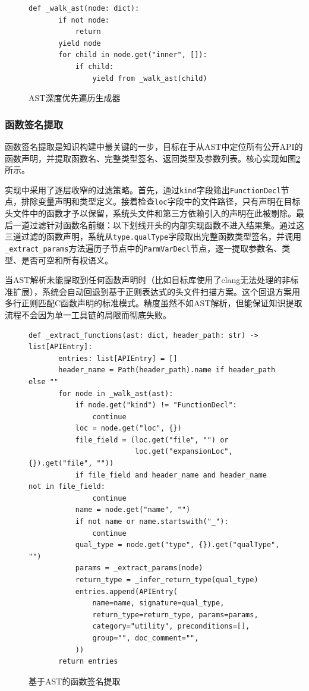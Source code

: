 \begin{figure}[H]
    \centering
    \begin{lstlisting}[style=style@python]
   def _walk_ast(node: dict):
       if not node:
           return
       yield node
       for child in node.get("inner", []):
           if child:
               yield from _walk_ast(child)
    \end{lstlisting}
    \caption{AST深度优先遍历生成器}
    \label{fig:walk-ast}
\end{figure}

\subsubsection{函数签名提取}

函数签名提取是知识构建中最关键的一步，目标在于从AST中定位所有公开API的函数声明，并提取函数名、完整类型签名、返回类型及参数列表。核心实现如图\ref{fig:extract-functions}所示。

实现中采用了逐层收窄的过滤策略。首先，通过\texttt{kind}字段筛出\texttt{FunctionDecl}节点，排除变量声明和类型定义。接着检查\texttt{loc}字段中的文件路径，只有声明在目标头文件中的函数才予以保留，系统头文件和第三方依赖引入的声明在此被剔除。最后一道过滤针对函数名前缀：以下划线开头的内部实现函数不进入结果集。通过这三道过滤的函数声明，系统从\texttt{type.qualType}字段取出完整函数类型签名，并调用\texttt{\_extract\_params}方法遍历子节点中的\texttt{ParmVarDecl}节点，逐一提取参数名、类型、是否可空和所有权语义。

当AST解析未能提取到任何函数声明时（比如目标库使用了clang无法处理的非标准扩展），系统会自动回退到基于正则表达式的头文件扫描方案。这个回退方案用多行正则匹配C函数声明的标准模式。精度虽然不如AST解析，但能保证知识提取流程不会因为单一工具链的局限而彻底失败。

\begin{figure}[H]
    \centering
    \begin{lstlisting}[style=style@python]
   def _extract_functions(ast: dict, header_path: str) -> list[APIEntry]:
       entries: list[APIEntry] = []
       header_name = Path(header_path).name if header_path else ""
       for node in _walk_ast(ast):
           if node.get("kind") != "FunctionDecl":
               continue
           loc = node.get("loc", {})
           file_field = (loc.get("file", "") or
                         loc.get("expansionLoc", {}).get("file", ""))
           if file_field and header_name and header_name not in file_field:
               continue
           name = node.get("name", "")
           if not name or name.startswith("_"):
               continue
           qual_type = node.get("type", {}).get("qualType", "")
           params = _extract_params(node)
           return_type = _infer_return_type(qual_type)
           entries.append(APIEntry(
               name=name, signature=qual_type,
               return_type=return_type, params=params,
               category="utility", preconditions=[],
               group="", doc_comment="",
           ))
       return entries
    \end{lstlisting}
    \caption{基于AST的函数签名提取}
    \label{fig:extract-functions}
\end{figure}

